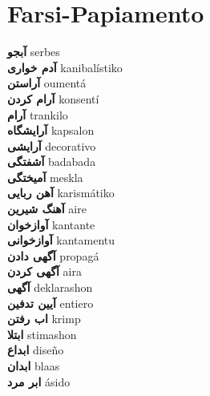 \twocolumn
\chapter{Farsi-Papiamento}
\small
{}\textbf{ آبجو  } serbes \\
\textbf{ آدم خواری  } kanibalístiko \\
\textbf{ آراستن  } oumentá \\
\textbf{ آرام کردن  } konsentí \\
\textbf{ آرام  } trankilo \\
\textbf{ آرایشگاه  } kapsalon \\
\textbf{ آرایشی  } decorativo \\
\textbf{ آشفتگی  } badabada \\
\textbf{ آمیختگی  } meskla \\
\textbf{ آهن ربایی  } karismátiko \\
\textbf{ آهنگ شیرین  } aire \\
\textbf{ آوازخوان  } kantante \\
\textbf{ آوازخوانی  } kantamentu \\
\textbf{ آگهی دادن  } propagá \\
\textbf{ آگهی کردن  } aira \\
\textbf{ آگهی  } deklarashon \\
\textbf{ آیین تدفین  } entiero \\
\textbf{ اب رفتن  } krimp \\
\textbf{ ابتلا  } stimashon \\
\textbf{ ابداع  } diseño \\
\textbf{ ابدان  } blaas \\
\textbf{ ابر مرد  } ásido \\
